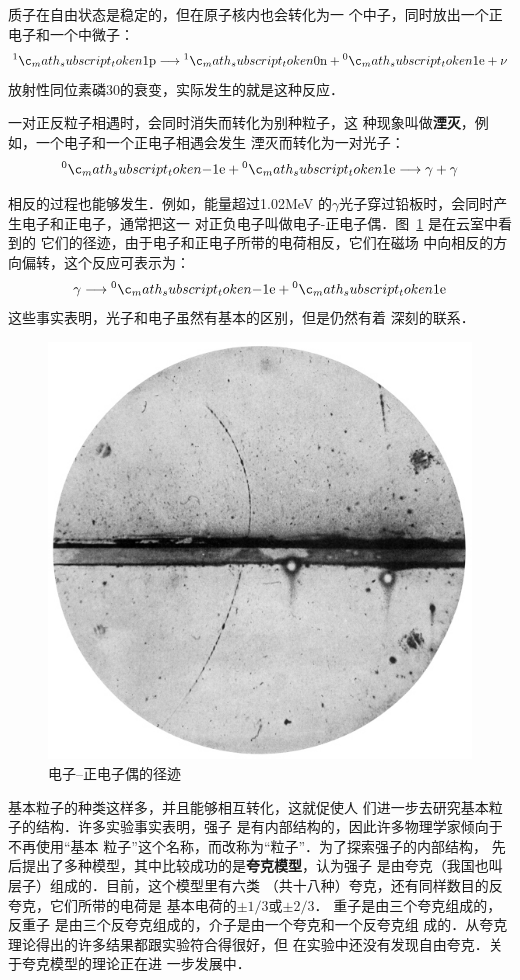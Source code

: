 质子在自由状态是稳定的，但在原子核内也会转化为一
个中子，同时放出一个正电子和一个中微子：
\[\atom{p}{1}{1}\longrightarrow \atom{n}{1}{0}+\atom{e}{0}{1}+\nu   \]
放射性同位素磷30的衰变，实际发生的就是这种反应．

一对正反粒子相遇时，会同时消失而转化为别种粒子，这
种现象叫做\textbf{湮灭}，例如，一个电子和一个正电子相遇会发生
湮灭而转化为一对光子：
\[\atom{e}{0}{-1}+\atom{e}{0}{1}\longrightarrow \gamma+\gamma  \]

相反的过程也能够发生．例如，能量超过1.02MeV
的$\gamma$光子穿过铅板时，会同时产生电子和正电子，通常把这一
对正负电子叫做电子-正电子偶．图~\ref{fig_C_9-16} 是在云室中看到的
它们的径迹，由于电子和正电子所带的电荷相反，它们在磁场
中向相反的方向偏转，这个反应可表示为：
\[\gamma\longrightarrow \atom{e}{0}{-1}+\atom{e}{0}{1} \]
这些事实表明，光子和电子虽然有基本的区别，但是仍然有着
深刻的联系．
\begin{figure}[htbp]
    \centering
    \includegraphics{fig/C/9-16.jpg}
    \caption{电子--正电子偶的径迹}\label{fig_C_9-16}
\end{figure}



基本粒子的种类这样多，并且能够相互转化，这就促使人
们进一步去研究基本粒子的结构．许多实验事实表明，强子
是有内部结构的，因此许多物理学家倾向于不再使用“基本
粒子”这个名称，而改称为“粒子”．为了探索强子的内部结构，
先后提出了多种模型，其中比较成功的是\textbf{夸克模型}，认为强子
是由夸克（我国也叫层子）组成的．目前，这个模型里有六类
（共十八种）夸克，还有同样数目的反夸克，它们所带的电荷是
基本电荷的$\pm1/3$或$\pm 2/3$．
重子是由三个夸克组成的，反重子
是由三个反夸克组成的，介子是由一个夸克和一个反夸克组
成的．从夸克理论得出的许多结果都跟实验符合得很好，但
在实验中还没有发现自由夸克．关于夸克模型的理论正在进
一步发展中．

